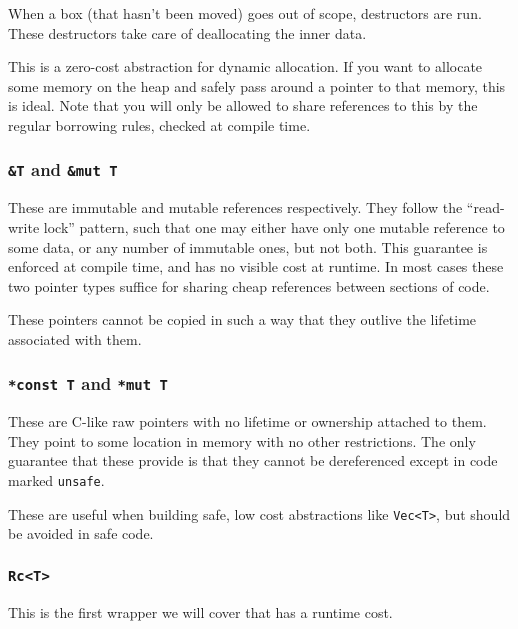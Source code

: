 \documentclass[a4paper,]{book}
\begin{document}
When a box (that hasn't been moved) goes out of scope, destructors are
run. These destructors take care of deallocating the inner data.

This is a zero-cost abstraction for dynamic allocation. If you want to
allocate some memory on the heap and safely pass around a pointer to
that memory, this is ideal. Note that you will only be allowed to share
references to this by the regular borrowing rules, checked at compile
time.

\subsubsection{\texorpdfstring{\texttt{\&T} and
\texttt{\&mut\ T}}{\&T and \&mut T}}\label{t-and-mut-t}

These are immutable and mutable references respectively. They follow the
``read-write lock'' pattern, such that one may either have only one
mutable reference to some data, or any number of immutable ones, but not
both. This guarantee is enforced at compile time, and has no visible
cost at runtime. In most cases these two pointer types suffice for
sharing cheap references between sections of code.

These pointers cannot be copied in such a way that they outlive the
lifetime associated with them.

\subsubsection{\texorpdfstring{\texttt{*const\ T} and
\texttt{*mut\ T}}{*const T and *mut T}}\label{const-t-and-mut-t}

These are C-like raw pointers with no lifetime or ownership attached to
them. They point to some location in memory with no other restrictions.
The only guarantee that these provide is that they cannot be
dereferenced except in code marked \texttt{unsafe}.

These are useful when building safe, low cost abstractions like
\texttt{Vec\textless{}T\textgreater{}}, but should be avoided in safe
code.

\subsubsection{\texorpdfstring{\texttt{Rc\textless{}T\textgreater{}}}{Rc\textless{}T\textgreater{}}}\label{rct}

This is the first wrapper we will cover that has a runtime cost.
\end{document}
